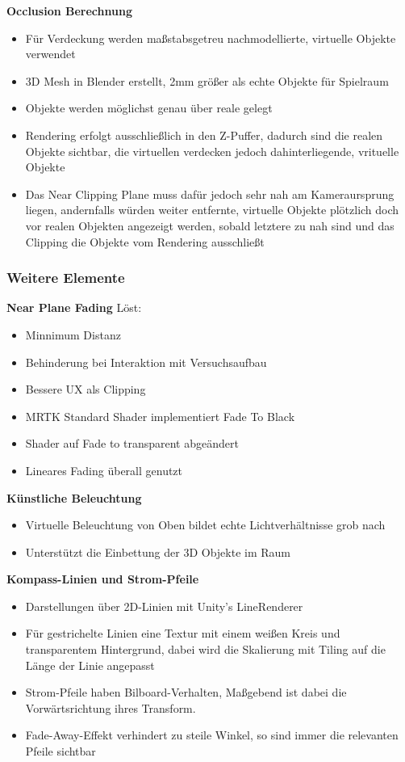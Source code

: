 \textbf{Occlusion Berechnung}
\begin{itemize}
	\item Für Verdeckung werden maßstabsgetreu nachmodellierte, virtuelle Objekte verwendet
	\item 3D Mesh in Blender erstellt, 2mm größer als echte Objekte für Spielraum
	\item Objekte werden möglichst genau über reale gelegt
	\item Rendering erfolgt ausschließlich in den Z-Puffer, dadurch sind die realen Objekte sichtbar, die virtuellen verdecken jedoch dahinterliegende, vrituelle Objekte
	\item Das Near Clipping Plane muss dafür jedoch sehr nah am Kameraursprung liegen, andernfalls würden weiter entfernte, virtuelle Objekte plötzlich doch vor realen Objekten angezeigt werden, sobald letztere zu nah sind und das Clipping die Objekte vom Rendering ausschließt
\end{itemize}

\subsubsection{Weitere Elemente}
\textbf{Near Plane Fading}
Löst: 
\begin{itemize}
	\item Minnimum Distanz
	\item Behinderung bei Interaktion mit Versuchsaufbau
	\item Bessere UX als Clipping
	\item MRTK Standard Shader implementiert Fade To Black
	\item Shader auf Fade to transparent abgeändert
	\item Lineares Fading überall genutzt
\end{itemize}



\textbf{Künstliche Beleuchtung}
\begin{itemize}
	\item Virtuelle Beleuchtung von Oben bildet echte Lichtverhältnisse grob nach
	\item Unterstützt die Einbettung der 3D Objekte im Raum
\end{itemize}


\textbf{Kompass-Linien und Strom-Pfeile}
\begin{itemize}
	\item Darstellungen über 2D-Linien mit Unity's LineRenderer
	\item Für gestrichelte Linien eine Textur mit einem weißen Kreis und transparentem Hintergrund, dabei wird die Skalierung mit Tiling auf die Länge der Linie angepasst
	\item Strom-Pfeile haben Bilboard-Verhalten, Maßgebend ist dabei die Vorwärtsrichtung ihres Transform.
	\item Fade-Away-Effekt verhindert zu steile Winkel, so sind immer die relevanten Pfeile sichtbar
\end{itemize}

